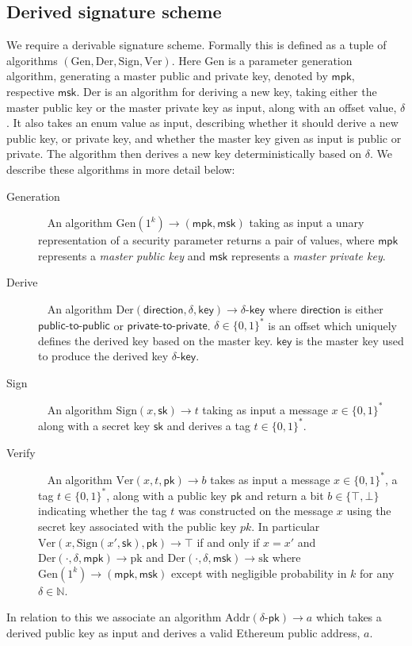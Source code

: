 \documentclass[11pt]{article} %
\newcommand{\mpk}{\ensuremath{\mathsf{mpk}}}
\newcommand{\msk}{\ensuremath{\mathsf{msk}}}
\newcommand{\pk}{\ensuremath{\mathsf{pk}}}
\newcommand{\Addr}{\ensuremath{\mathrm{Addr}}}
\begin{document}
\subsection{Derived signature scheme}
We require a derivable signature scheme. Formally this is defined as a tuple of algorithms $(\mathrm{Gen, Der, Sign, Ver})$. Here $\mathrm{Gen}$ is a parameter generation algorithm, generating a master public and private key, denoted by $\mpk$, respective $\msk$. $\mathrm{Der}$ is an algorithm for deriving a new key, taking either the master public key or the master private key as input, along with an offset value, $\delta$. It also takes an enum value as input, describing whether it should derive a new public key, or private key, and whether the master key given as input is public or private. The algorithm then derives a new key deterministically based on $\delta$.  We describe these algorithms in more detail below:
\begin{description}
	\item[Generation] ~ An algorithm $\mathrm{Gen}(1^k) \to (\mathsf{mpk}, \mathsf{msk})$ taking as input a unary representation of a security parameter returns a pair of values, where $\mpk$ represents a \emph{master public key} and $\msk$ represents a \emph{master private key}. 
	\item[Derive] ~ An algorithm $\mathrm{Der}(\mathsf{direction}, \delta, \mathsf{key})\to \delta\mbox{-}\mathsf{key}$ where $\mathsf{direction}$ is either $\mathsf{public}\mbox{-}\allowbreak\mathsf{to}\mbox{-}\mathsf{public}$ or $\mathsf{private}\mbox{-}\mathsf{to}\mbox{-}\mathsf{private}$. $\delta\in \{0,1\}^*$ is an offset which uniquely defines the derived key based on the master key.  $\mathsf{key}$ is the master key used to produce the derived key $\delta\mbox{-}\mathsf{key}$.
	\item[Sign] ~ An algorithm $\mathrm{Sign}(x, \mathsf{sk})\to t$ taking as input a message $x\in\{0,1\}^*$ along with a secret key $\mathsf{sk}$ and derives a tag $t\in\{0,1\}^*$.
	\item[Verify] ~ An algorithm $\mathrm{Ver}(x, t, \mathsf{pk}) \to b$ takes as input a message $x\in \{0,1\}^*$, a tag $t\in \{0,1\}^*$, along with a public key $\mathsf{pk}$ and return a bit $b\in\{\top, \bot\}$ indicating whether the tag $t$ was constructed on the message $x$ using the secret key associated with the public key $pk$. In particular $\mathrm{Ver}(x, \mathrm{Sign}(x', \mathsf{sk}), \mathsf{pk})\to \top$ if and only if $x=x'$ and $\mathrm{Der}(\cdot, \delta, \mathsf{mpk})\to \mathrm{pk}$ and $\mathrm{Der}(\cdot, \delta, \mathsf{\msk})\to \mathrm{sk}$ where $\mathrm{Gen}(1^k)\to (\mathsf{mpk}, \mathsf{msk})$ except with negligible probability in $k$ for any $\delta\in\mathbb{N}$.
\end{description}
In relation to this we associate an algorithm $\Addr (\delta\mbox{-}\pk)\to a$ which takes a derived public key as input and derives a valid Ethereum public address, $a$.
\end{document}
